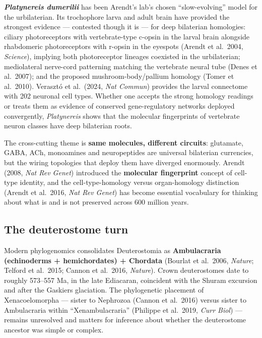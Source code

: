 \textbf{\emph{Platynereis dumerilii}} has been Arendt's lab's chosen ``slow-evolving'' model for the urbilaterian. Its trochophore larva and adult brain have provided the strongest evidence --- contested though it is --- for deep bilaterian homologies: ciliary photoreceptors with vertebrate-type c-opsin in the larval brain alongside rhabdomeric photoreceptors with r-opsin in the eyespots (Arendt et al.~2004, \emph{Science}), implying both photoreceptor lineages coexisted in the urbilaterian; mediolateral nerve-cord patterning matching the vertebrate neural tube (Denes et al.~2007); and the proposed mushroom-body/pallium homology (Tomer et al.~2010). Verasztó et al.~(2024, \emph{Nat Commun}) provides the larval connectome with 202 neuronal cell types. Whether one accepts the strong homology readings or treats them as evidence of conserved gene-regulatory networks deployed convergently, \emph{Platynereis} shows that the molecular fingerprints of vertebrate neuron classes have deep bilaterian roots.

The cross-cutting theme is \textbf{same molecules, different circuits}: glutamate, GABA, ACh, monoamines and neuropeptides are universal bilaterian currencies, but the wiring topologies that deploy them have diverged enormously. Arendt (2008, \emph{Nat Rev Genet}) introduced the \textbf{molecular fingerprint} concept of cell-type identity, and the cell-type-homology versus organ-homology distinction (Arendt et al.~2016, \emph{Nat Rev Genet}) has become essential vocabulary for thinking about what is and is not preserved across 600 million years.

\subsection{The deuterostome turn}\label{04_urbilateria-the-deuterostome-turn}

Modern phylogenomics consolidates Deuterostomia as \textbf{Ambulacraria (echinoderms + hemichordates) + Chordata} (Bourlat et al.~2006, \emph{Nature}; Telford et al.~2015; Cannon et al.~2016, \emph{Nature}). Crown deuterostomes date to roughly 573--557 Ma, in the late Ediacaran, coincident with the Shuram excursion and after the Gaskiers glaciation. The phylogenetic placement of Xenacoelomorpha --- sister to Nephrozoa (Cannon et al.~2016) versus sister to Ambulacraria within ``Xenambulacraria'' (Philippe et al.~2019, \emph{Curr Biol}) --- remains unresolved and matters for inference about whether the deuterostome ancestor was simple or complex.

